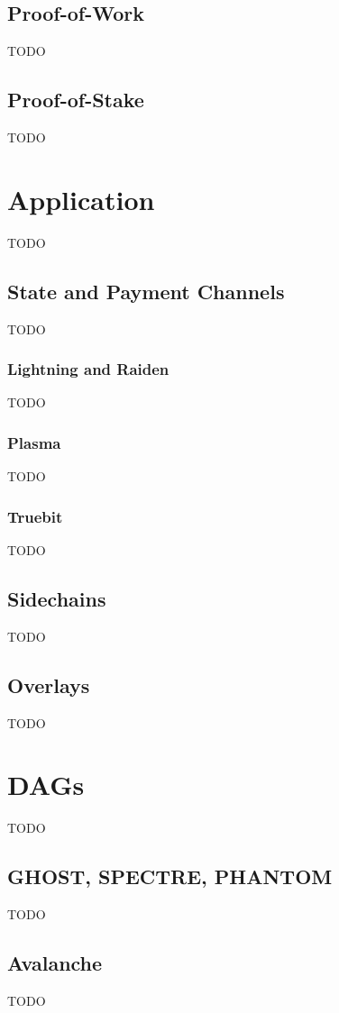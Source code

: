 \documentclass{article}
\begin{document}
\subsection{Proof-of-Work}
TODO

\subsection{Proof-of-Stake}
TODO


\section{Application}
TODO

\subsection{State and Payment Channels}
TODO

\subsubsection{Lightning and Raiden}
TODO

\subsubsection{Plasma}
TODO

\subsubsection{Truebit}
TODO

\subsection{Sidechains}
TODO

\subsection{Overlays}
TODO


\section{DAGs}
TODO

\subsection{GHOST, SPECTRE, PHANTOM}
TODO

\subsection{Avalanche}
TODO
\end{document}

